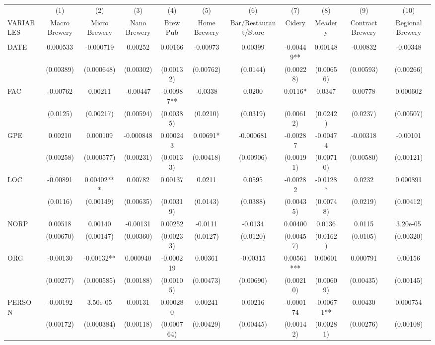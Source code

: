\begin{tabular}{lcccccccccc} \hline
    & (1) & (2) & (3) & (4) & (5) & (6) & (7) & (8) & (9) & (10) \\
   VARIABLES & Macro Brewery & Micro Brewery & Nano Brewery & Brew Pub & Home Brewery & Bar/Restaurant/Store & Cidery & Meadery & Contract Brewery & Regional Brewery \\ \hline
    &  &  &  &  &  &  &  &  &  &  \\
   DATE & 0.000533 & -0.000719 & 0.00252 & 0.00166 & -0.00973 & 0.00399 & -0.00449** & 0.00148 & -0.00832 & -0.00348 \\
    & (0.00389) & (0.000648) & (0.00302) & (0.00132) & (0.00762) & (0.0144) & (0.00228) & (0.00656) & (0.00593) & (0.00266) \\
   FAC & -0.00762 & 0.00211 & -0.00447 & -0.00987** & -0.0338 & 0.0200 & 0.0116* & 0.0347 & 0.00778 & 0.000602 \\
    & (0.0125) & (0.00217) & (0.00594) & (0.00385) & (0.0210) & (0.0319) & (0.00612) & (0.0242) & (0.0237) & (0.00507) \\
   GPE & 0.00210 & 0.000109 & -0.000848 & 0.000243 & 0.00691* & -0.000681 & -0.00287 & -0.00474 & -0.00318 & -0.00101 \\
    & (0.00258) & (0.000577) & (0.00231) & (0.00133) & (0.00418) & (0.00906) & (0.00191) & (0.00710) & (0.00580) & (0.00121) \\
   LOC & -0.00891 & 0.00402*** & 0.00782 & 0.00137 & 0.0211 & 0.0595 & -0.00282 & -0.0128* & 0.0232 & 0.000891 \\
    & (0.0116) & (0.00149) & (0.00635) & (0.00319) & (0.0143) & (0.0388) & (0.00435) & (0.00748) & (0.0219) & (0.00412) \\
   NORP & 0.00518 & 0.00140 & -0.00131 & 0.00252 & -0.0111 & -0.0134 & 0.00400 & 0.0136 & 0.0115 & 3.20e-05 \\
    & (0.00670) & (0.00147) & (0.00360) & (0.00233) & (0.0127) & (0.0120) & (0.00457) & (0.0162) & (0.0105) & (0.00320) \\
   ORG & -0.00130 & -0.00132** & 0.000940 & -0.000219 & 0.00361 & -0.00315 & 0.00561*** & 0.00601 & 0.000791 & 0.00156 \\
    & (0.00277) & (0.000585) & (0.00188) & (0.00105) & (0.00473) & (0.00690) & (0.00210) & (0.00609) & (0.00435) & (0.00145) \\
   PERSON & -0.00192 & 3.50e-05 & 0.00131 & 0.000280 & 0.00241 & 0.00216 & -0.000174 & -0.00671** & 0.00430 & 0.000754 \\
    & (0.00172) & (0.000384) & (0.00118) & (0.000764) & (0.00429) & (0.00445) & (0.00142) & (0.00281) & (0.00276) & (0.00108) \\

\end{tabular}
